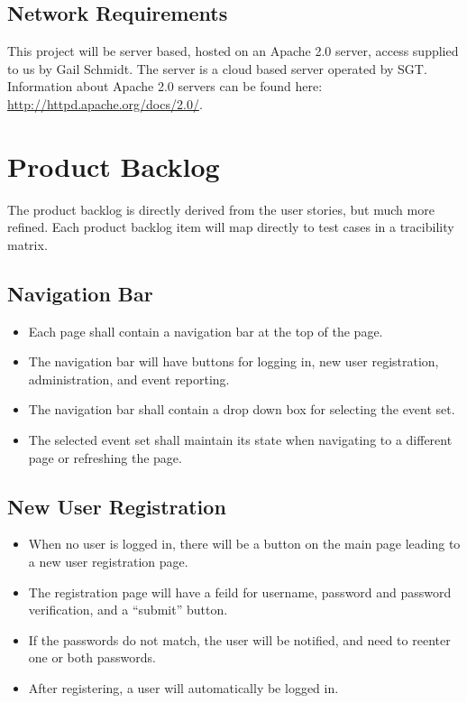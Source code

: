 \subsection{Network Requirements}
This project will be server based, hosted on an Apache 2.0 server, access supplied to us by Gail Schmidt. The server is a cloud based server operated by SGT. Information about Apache 2.0 servers can be found here: \url{http://httpd.apache.org/docs/2.0/}. 

\section{Product Backlog}
The product backlog is directly derived from the user stories, but much more refined. Each product backlog item will map directly to test cases in a tracibility matrix.

\subsection{Navigation Bar}
\begin{itemize}
\item Each page shall contain a navigation bar at the top of the page.
\item The navigation bar will have buttons for logging in, new user registration, administration, and event reporting.
\item The navigation bar shall contain a drop down box for selecting the event set.
\item The selected event set shall maintain its state when navigating to a different page or refreshing the page.
\end{itemize}

\subsection{New User Registration}
\begin{itemize}
\item When no user is logged in, there will be a button on the main page leading to a new user registration page.
\item The registration page will have a feild for username, password and password verification, and a ``submit'' button.
\item If the passwords do not match, the user will be notified, and need to reenter one or both passwords.
\item After registering, a user will automatically be logged in.
\end{itemize}

